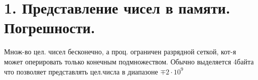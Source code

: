 \documentclass{article}
\begin{document}
\section{1. Представление чисел в памяти. Погрешности.}
Множ-во цел. чисел бесконечно, а проц. ограничен разрядной сеткой, кот-я
может оперировать только конечным подмножеством. Обычно выделяется 4байта что
позволяет представлять цел.числа в диапазоне $\mp 2 \cdot 10^9$
\end{document}
